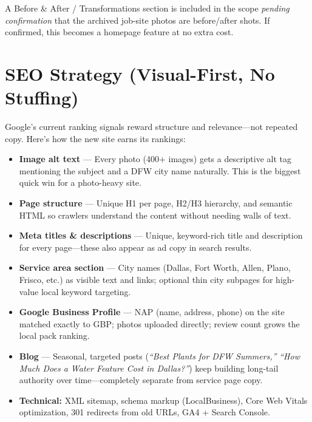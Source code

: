 \documentclass[11pt, letterpaper]{article}
\begin{document}
\vspace{-4pt}
\begin{notebox}
\small A Before \& After / Transformations section is included in the scope
\emph{pending confirmation} that the archived job-site photos are before/after
shots. If confirmed, this becomes a homepage feature at no extra cost.
\end{notebox}

\section{SEO Strategy (Visual-First, No Stuffing)}

Google's current ranking signals reward structure and relevance---not repeated
copy. Here's how the new site earns its rankings:

\begin{itemize}
  \item \textbf{Image alt text} --- Every photo (400$+$ images) gets a
        descriptive alt tag mentioning the subject and a DFW city name naturally.
        This is the biggest quick win for a photo-heavy site.
  \item \textbf{Page structure} --- Unique H1 per page, H2/H3 hierarchy, and
        semantic HTML so crawlers understand the content without needing walls
        of text.
  \item \textbf{Meta titles \& descriptions} --- Unique, keyword-rich title and
        description for every page---these also appear as ad copy in search results.
  \item \textbf{Service area section} --- City names (Dallas, Fort Worth, Allen,
        Plano, Frisco, etc.) as visible text and links; optional thin city subpages
        for high-value local keyword targeting.
  \item \textbf{Google Business Profile} --- NAP (name, address, phone) on the
        site matched exactly to GBP; photos uploaded directly; review count grows
        the local pack ranking.
  \item \textbf{Blog} --- Seasonal, targeted posts (\emph{``Best Plants for DFW
        Summers,''} \emph{``How Much Does a Water Feature Cost in Dallas?''}) keep
        building long-tail authority over time---completely separate from service
        page copy.
  \item \textbf{Technical:} XML sitemap, schema markup (LocalBusiness), Core
        Web Vitals optimization, 301 redirects from old URLs, GA4 + Search Console.
\end{itemize}
\end{document}
